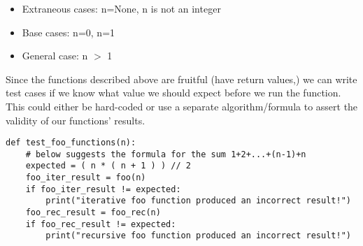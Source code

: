 \begin{enumerate}
\begin{answer}
\begin{itemize}
\item Extraneous cases: n=None, n is not an integer
\item Base cases: n=0, n=1
\item General case: n $>$ 1
\end{itemize}
Since the functions described above are fruitful (have return values,) we can write test cases if we know what
value we should expect before we run the function. This could either be hard-coded or use a separate algorithm/formula
to assert the validity of our functions' results.\\
\begin{lstlisting}
def test_foo_functions(n):
	# below suggests the formula for the sum 1+2+...+(n-1)+n
	expected = ( n * ( n + 1 ) ) // 2
	foo_iter_result = foo(n)
	if foo_iter_result != expected:
		print("iterative foo function produced an incorrect result!")
	foo_rec_result = foo_rec(n)
	if foo_rec_result != expected:
		print("recursive foo function produced an incorrect result!")
\end{lstlisting}
\end{answer}

\end{enumerate}




